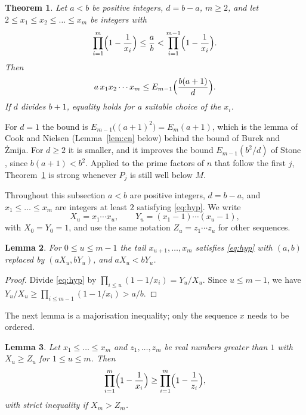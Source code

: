 \documentclass[11pt,reqno]{amsart}
\numberwithin{equation}{section}
\theoremstyle{plain}
\newtheorem{theorem}{Theorem}[section]
\newtheorem{lemma}[theorem]{Lemma}
\theoremstyle{definition}
\theoremstyle{remark}
\begin{document}
\begin{theorem}\label{thm:deficit}
Let $a<b$ be positive integers, $d=b-a$, $m\ge2$, and let
$2\le x_1\le x_2\le\dots\le x_m$ be integers with
\begin{equation}\label{eq:hyp}
  \prod_{i=1}^{m}\Bigl(1-\frac1{x_i}\Bigr)\le\frac ab
  <\prod_{i=1}^{m-1}\Bigl(1-\frac1{x_i}\Bigr).
\end{equation}
Then
\[
  a\,x_1x_2\cdots x_m\le E_{m-1}\Bigl(\frac{b(a+1)}{d}\Bigr).
\]
If $d$ divides $b+1$, equality holds for a suitable choice of the
$x_i$.
\end{theorem}

For $d=1$ the bound is $E_{m-1}\bigl((a+1)^2\bigr)=E_m(a+1)$, which is
the lemma of Cook and Nielsen (Lemma~\ref{lem:cn} below) behind the
bound of Burek and \.Zmija. For $d\ge2$ it is smaller, and it improves
the bound $E_{m-1}(b^2/d)$ of Stone \cite[Corollary~1]{Sto24}, since
$b(a+1)<b^2$. Applied to the prime factors of $n$ that follow the
first $j$, Theorem~\ref{thm:deficit} is strong whenever $P_j$ is still
well below $M$.

Throughout this subsection $a<b$ are positive integers, $d=b-a$, and
$x_1\le\dots\le x_m$ are integers at least $2$ satisfying
\eqref{eq:hyp}. We write
\[
  X_u=x_1\cdots x_u,\qquad Y_u=(x_1-1)\cdots(x_u-1),
\]
with $X_0=Y_0=1$, and use the same notation $Z_u=z_1\cdots z_u$ for
other sequences.

\begin{lemma}\label{lem:tail}
For $0\le u\le m-1$ the tail $x_{u+1},\dots,x_m$ satisfies
\eqref{eq:hyp} with $(a,b)$ replaced by $(aX_u,bY_u)$, and
$aX_u<bY_u$.
\end{lemma}

\begin{proof}
Divide \eqref{eq:hyp} by $\prod_{i\le u}(1-1/x_i)=Y_u/X_u$. Since
$u\le m-1$, we have $Y_u/X_u\ge\prod_{i\le m-1}(1-1/x_i)>a/b$.
\end{proof}

The next lemma is a majorisation inequality; only the sequence $x$
needs to be ordered.

\begin{lemma}\label{lem:major}
Let $x_1\le\dots\le x_m$ and $z_1,\dots,z_m$ be real numbers greater
than $1$ with $X_u\ge Z_u$ for $1\le u\le m$. Then
\[
  \prod_{i=1}^{m}\Bigl(1-\frac1{x_i}\Bigr)\ge
  \prod_{i=1}^{m}\Bigl(1-\frac1{z_i}\Bigr),
\]
with strict inequality if $X_m>Z_m$.
\end{lemma}
\end{document}
